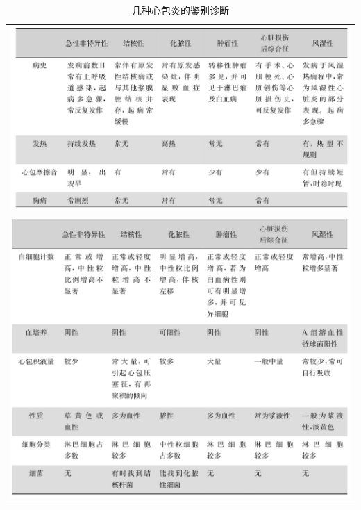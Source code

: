 \begin{longtable}{c}
  \caption{几种心包炎的鉴别诊断}
  \label{tabhello}
  \endfirsthead
  \caption[]{几种心包炎的鉴别诊断}
  \endhead
  \includegraphics[width=\textwidth,height=\textheight,keepaspectratio]{./images/Image00111.jpg}\\
  \includegraphics[width=\textwidth,height=\textheight,keepaspectratio]{./images/Image00112.jpg}
\end{longtable}


